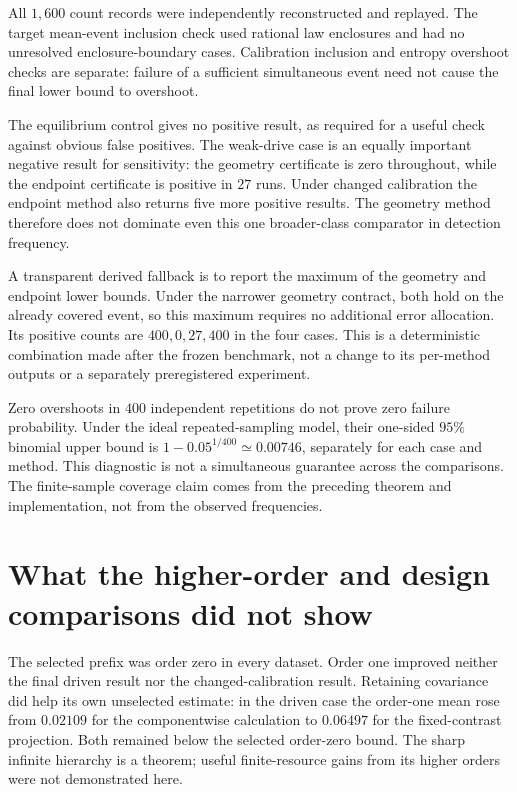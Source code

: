 All $1{,}600$ count records were independently reconstructed and replayed.
The target mean-event inclusion check used rational law enclosures and had
no unresolved enclosure-boundary cases.  Calibration inclusion and entropy
overshoot checks are separate: failure of a sufficient simultaneous event
need not cause the final lower bound to overshoot.

The equilibrium control gives no positive result, as required for a useful
check against obvious false positives.  The weak-drive case is an equally
important negative result for sensitivity: the geometry certificate is zero
throughout, while the endpoint certificate is positive in $27$ runs.  Under
changed calibration the endpoint method also returns five more positive
results.  The geometry method therefore does not dominate even this one
broader-class comparator in detection frequency.

A transparent derived fallback is to report the maximum of the geometry and
endpoint lower bounds.  Under the narrower geometry contract, both hold on
the already covered event, so this maximum requires no additional error
allocation.  Its positive counts are $400,0,27,400$ in the four cases.
This is a deterministic combination made after the frozen benchmark, not a
change to its per-method outputs or a separately preregistered experiment.

Zero overshoots in $400$ independent repetitions do not prove zero failure
probability.  Under the ideal repeated-sampling model, their one-sided
$95\%$ binomial upper bound is $1-0.05^{1/400}\simeq0.00746$, separately for
each case and method.  This diagnostic is not a simultaneous guarantee
across the comparisons.  The finite-sample coverage claim comes from the
preceding theorem and implementation, not from the observed frequencies.

\section{What the higher-order and design comparisons did not show}

The selected prefix was order zero in every dataset.  Order one improved
neither the final driven result nor the changed-calibration result.  Retaining
covariance did help its own unselected estimate: in the driven case the
order-one mean rose from $0.02109$ for the componentwise calculation to
$0.06497$ for the fixed-contrast projection.  Both remained below the selected
order-zero bound.  The sharp infinite hierarchy is a theorem; useful
finite-resource gains from its higher orders were not demonstrated here.

